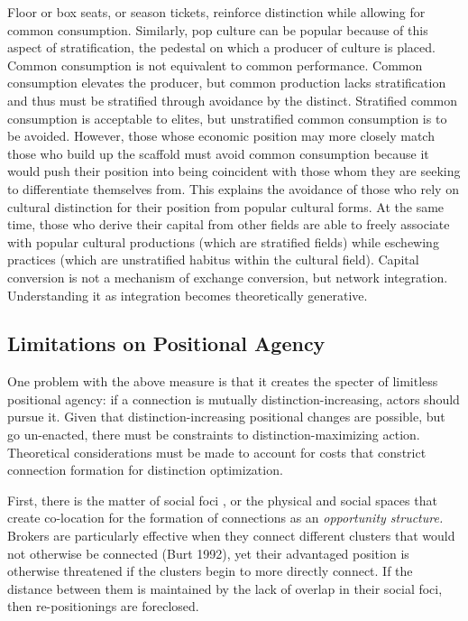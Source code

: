 \documentclass[12pt]{article}
\begin{document}
Floor or box seats, or season tickets, reinforce distinction while allowing for common consumption. Similarly, pop culture can be popular because of this aspect of stratification, the pedestal on which a producer of culture is placed. Common consumption is not equivalent to common performance. Common consumption elevates the producer, but common production lacks stratification and thus must be stratified through avoidance by the distinct. Stratified common consumption is acceptable to elites, but unstratified common consumption is to be avoided. However, those whose economic position may more closely match those who build up the scaffold must avoid common consumption because it would push their position into being coincident with those whom they are seeking to differentiate themselves from. This explains the avoidance of those who rely on cultural distinction for their position from popular cultural forms. At the same time, those who derive their capital from other fields are able to freely associate with popular cultural productions (which are stratified fields) while eschewing practices (which are unstratified habitus within the cultural field). Capital conversion is not a mechanism of exchange conversion, but network integration. Understanding it as integration becomes theoretically generative.     


\subsection{Limitations on Positional Agency}
One problem with the above measure is that it creates the specter of limitless positional agency: if a connection is mutually distinction-increasing, actors should pursue it. Given that distinction-increasing positional changes are possible, but go un-enacted, there must be constraints to distinction-maximizing action. Theoretical considerations must be made to account for costs that constrict connection formation for distinction optimization. 

First, there is the matter of social foci \citep{feld1981focused}, or the physical and social spaces that create co-location for the formation of connections as an \textit{opportunity structure.} Brokers are particularly effective when they connect different clusters that would not otherwise be connected (Burt 1992), yet their advantaged position is otherwise threatened if the clusters begin to more directly connect. If the distance between them is maintained by the lack of overlap in their social foci, then re-positionings are foreclosed.   
\end{document}
